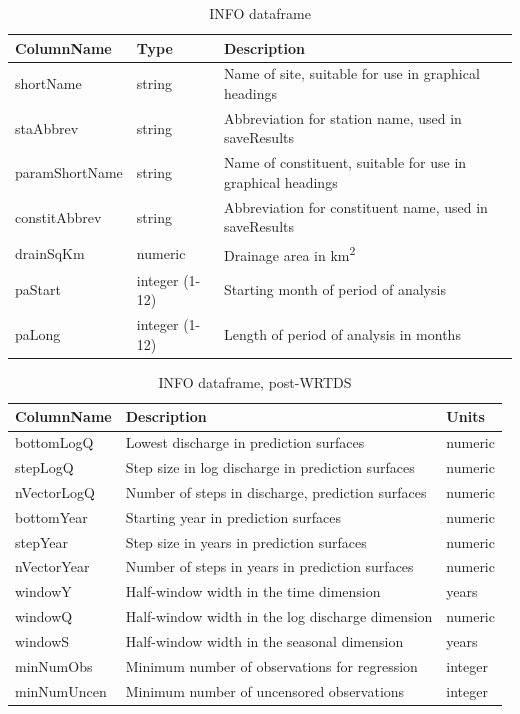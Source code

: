 \documentclass[a4paper,11pt]{article}\usepackage{graphicx, color}
\begin{document}
\begin{table}[!ht]
\begin{minipage}{\linewidth}
\begin{center}
\caption{INFO dataframe}
\label{table:Info1}
\begin{tabular}{lll}
  \hline
ColumnName & Type & Description \\ 
  \hline
  shortName & string & Name of site, suitable for use in graphical headings \\ 
  staAbbrev & string & Abbreviation for station name, used in saveResults \\ 
  paramShortName & string & Name of constituent, suitable for use in graphical headings \\ 
  constitAbbrev & string & Abbreviation for constituent name, used in saveResults \\ 
  drainSqKm & numeric & Drainage area in  km\textsuperscript{2} \\ 
  paStart \footnotemark[1] & integer (1-12) & Starting month of period of analysis \\ 
  paLong \footnotemark[1] & integer (1-12) & Length of period of analysis in months \\ 
   \hline
\end{tabular}
\end{center}
\end{minipage}
\end{table}


\begin{table}[!ht]
\centering
\caption{INFO dataframe, post-WRTDS} 
\label{table:Info2}
\begin{tabular}{lll}
  \hline
ColumnName & Description & Units \\ 
  \hline
bottomLogQ & Lowest discharge in prediction surfaces & numeric \\ 
  stepLogQ & Step size in log discharge in prediction surfaces & numeric \\ 
  nVectorLogQ & Number of steps in discharge, prediction surfaces & numeric \\ 
  bottomYear & Starting year in prediction surfaces & numeric \\ 
  stepYear & Step size in years in prediction surfaces & numeric \\ 
  nVectorYear & Number of steps in years in prediction surfaces & numeric \\ 
  windowY & Half-window width in the time dimension & years \\ 
  windowQ & Half-window width in the log discharge dimension & numeric \\ 
  windowS & Half-window width in the seasonal dimension & years \\ 
  minNumObs & Minimum number of observations for regression & integer \\ 
  minNumUncen & Minimum number of uncensored observations & integer \\ 
   \hline
\end{tabular}
\end{table}
\end{document}
